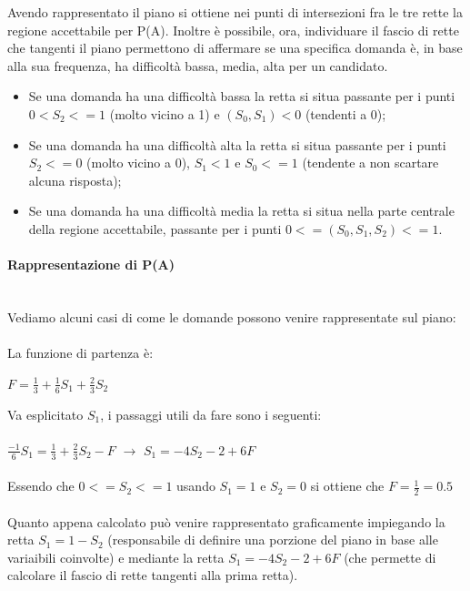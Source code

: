 \noindent Avendo rappresentato il piano si ottiene nei punti di intersezioni fra le tre rette la regione accettabile per P(A). Inoltre \`e possibile, ora, individuare il fascio di rette che tangenti il piano permettono di affermare se una specifica domanda \`e, in base alla sua frequenza, ha difficolt\`a bassa, media, alta per un candidato.
\begin{itemize}
\item Se una domanda ha una difficolt\`a bassa la retta si situa passante per i punti $0<S_2<=1$ (molto vicino a 1) e $(S_0, S_1)<0$ (tendenti a 0);
\item Se una domanda ha una difficolt\`a alta la retta si situa passante per i punti $S_2<=0$ (molto vicino a 0), $S_1<1$ e $S_0<=1$ (tendente a non scartare alcuna risposta);
\item Se una domanda ha una difficolt\`a media la retta si situa nella parte centrale della regione accettabile, passante per i punti $0<=(S_0, S_1, S_2)<=1$.\end{itemize}

\paragraph{Rappresentazione di P(A)}\mbox\\\\

\noindent Vediamo alcuni casi di come le domande possono venire rappresentate sul piano:\\\\
La funzione di partenza \`e:
\begin{center}$F=\frac{1}{3}+\frac{1}{6}S_1+\frac{2}{3}S_2$\end{center}
Va esplicitato $S_1$, i passaggi utili da fare sono i seguenti:\\\\
$\frac{-1}{6}S_1=\frac{1}{3}+\frac{2}{3}S_2-F$ $\rightarrow$ $S_1=-4S_2-2+6F$\\\\
Essendo  che $0<=S_2<=1$ usando $S_1=1$ e $S_2=0$ si ottiene che $F=\frac{1}{2}=0.5$\\
\\
Quanto appena calcolato pu\`o venire rappresentato graficamente impiegando la retta $S_1=1-S_2$ (responsabile di definire una porzione del piano in base alle variaibili coinvolte) e mediante la retta $S_1=-4S_2-2+6F$ (che permette di calcolare il fascio di rette tangenti alla prima retta). \\

